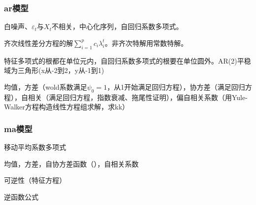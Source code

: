 \subsubsection{ar模型}
白噪声、$\varepsilon_t$与$X_t$不相关，中心化序列，自回归系数多项式。\par
齐次线性差分方程的解$\sum\limits_{i=1}^{p}c_i\lambda_i^t$。非齐次特解用常数特解。\par
特征多项式的根都在单位元内，自回归系数多项式的根要在单位圆外。AR(2)平稳域为三角形(x从-2到2，y从-1到1)\par
均值，方差（wold系数满足$\psi_0=1$，从1开始满足回归方程），协方差（满足回归方程），自相关（满足回归方程，指数衰减、拖尾性证明），偏自相关系数（用Yule-Walker方程构造线性方程组求解，求kk）
\subsubsection{ma模型}
移动平均系数多项式\par
均值，方差，自协方差函数（），自相关系数\par
可逆性（特征方程）\par
逆函数公式